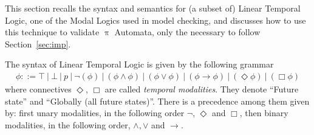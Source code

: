 \documentclass[a4paper,openany]{book}
\begin{document}

This section recalls the syntax and semantics for (a subset of) Linear Temporal Logic, one of the Modal Logics used in model checking, and discusses how to use this technique to validate $\uppi$ Automata, only the necessary to follow Section~\ref{sec:imp}.

The syntax of Linear Temporal Logic is given by the following grammar 
$$\begin{array}{c}
\phi ::= \top ~|~ \bot ~|~ p ~|~ \neg(\phi) ~|~ (\phi \land \phi) ~|~ (\phi \lor \phi) ~|~ (\phi \to \phi) ~|~ 
(\Diamond \phi) ~|~ (\Box \phi) 
\end{array}$$
where connectives $\Diamond$, $\Box$
are called \emph{temporal modalities}. They denote ``Future state'' and ``Globally (all future states)''. There is a precedence among them given by: first unary modalities, in the following order $\neg$, $\Diamond$ and $\Box$, then binary modalities, in the following order, $\land, \lor$ and $\to$. %
\end{document}
